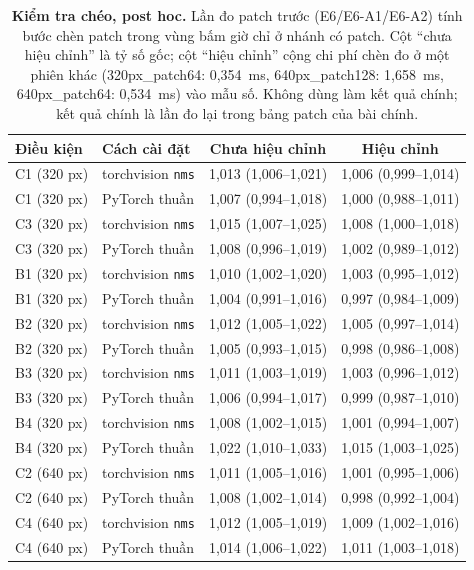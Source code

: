 \documentclass[11pt,a4paper]{article}
\begin{document}
\begin{table}[t]
\centering\small
\caption{\textbf{Kiểm tra chéo, post hoc.} Lần đo patch trước (E6/E6-A1/E6-A2) tính bước chèn patch trong vùng bấm giờ chỉ ở nhánh có patch. Cột ``chưa hiệu chỉnh'' là tỷ số gốc; cột ``hiệu chỉnh'' cộng chi phí chèn đo ở một phiên khác (320px_patch64: 0,354~ms, 640px_patch128: 1,658~ms, 640px_patch64: 0,534~ms) vào mẫu số. Không dùng làm kết quả chính; kết quả chính là lần đo lại trong bảng patch của bài chính.}
\label{tab:supp_corrected}
\begin{tabular}{@{}llcc@{}}
\toprule
Điều kiện & Cách cài đặt & Chưa hiệu chỉnh & Hiệu chỉnh \\
\midrule
C1 (320 px) & torchvision \texttt{nms} & 1,013 (1,006--1,021) & 1,006 (0,999--1,014) \\
C1 (320 px) & PyTorch thuần & 1,007 (0,994--1,018) & 1,000 (0,988--1,011) \\
C3 (320 px) & torchvision \texttt{nms} & 1,015 (1,007--1,025) & 1,008 (1,000--1,018) \\
C3 (320 px) & PyTorch thuần & 1,008 (0,996--1,019) & 1,002 (0,989--1,012) \\
B1 (320 px) & torchvision \texttt{nms} & 1,010 (1,002--1,020) & 1,003 (0,995--1,012) \\
B1 (320 px) & PyTorch thuần & 1,004 (0,991--1,016) & 0,997 (0,984--1,009) \\
B2 (320 px) & torchvision \texttt{nms} & 1,012 (1,005--1,022) & 1,005 (0,997--1,014) \\
B2 (320 px) & PyTorch thuần & 1,005 (0,993--1,015) & 0,998 (0,986--1,008) \\
B3 (320 px) & torchvision \texttt{nms} & 1,011 (1,003--1,019) & 1,003 (0,996--1,012) \\
B3 (320 px) & PyTorch thuần & 1,006 (0,994--1,017) & 0,999 (0,987--1,010) \\
B4 (320 px) & torchvision \texttt{nms} & 1,008 (1,002--1,015) & 1,001 (0,994--1,007) \\
B4 (320 px) & PyTorch thuần & 1,022 (1,010--1,033) & 1,015 (1,003--1,025) \\
C2 (640 px) & torchvision \texttt{nms} & 1,011 (1,005--1,016) & 1,001 (0,995--1,006) \\
C2 (640 px) & PyTorch thuần & 1,008 (1,002--1,014) & 0,998 (0,992--1,004) \\
C4 (640 px) & torchvision \texttt{nms} & 1,012 (1,005--1,019) & 1,009 (1,002--1,016) \\
C4 (640 px) & PyTorch thuần & 1,014 (1,006--1,022) & 1,011 (1,003--1,018) \\
\bottomrule
\end{tabular}
\end{table}
\end{document}
